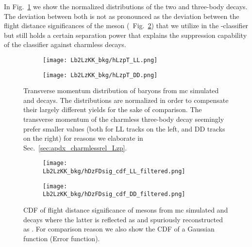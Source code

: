 In Fig.~\ref{fig:apdx_charmlessrel_ptLz} we show the normalized \pt distributions of the two and three-body decays.
The deviation between both is not as pronounced as the deviation between the flight distance significances of the \Dz meson (\cf{}~Fig.~\ref{fig:apdx_charmlessrel_fdDz}) that we utilize in the \Lb-\Dz classifier but still holds a certain separation power that explains the suppression capability of the \Lz classifier against charmless decays.
\begin{figure}[htbp]
    \centering
    \begin{subfigure}{.49\textwidth}
        \centering
        \texttt{[image: Lb2LzKK\_bkg/hLzpT\_LL.png]}
    \end{subfigure}
    \begin{subfigure}{.49\textwidth}
        \centering
        \texttt{[image: Lb2LzKK\_bkg/hLzpT\_DD.png]}
    \end{subfigure}
    \caption{Transverse momentum distribution of \Lz baryons from \gls{mc} simulated \decay{\Lb}{\Dz\Lz} and \decay{\Lb}{\Lz\Km\Kp} decays. The distributions are normalized in order to compensate their largely different yields for the sake of comparison. The transverse momentum of the charmless three-body decay seemingly prefer smaller values (both for \gls{LL} tracks on the left, and \gls{DD} tracks on the right) for reasons we elaborate in Sec.~\ref{sec:apdx_charmlessrel_Lzp}.}
    \label{fig:apdx_charmlessrel_ptLz}
\end{figure}

\begin{figure}[htbp]
    \centering
    \begin{subfigure}{.49\textwidth}
        \centering
        \texttt{[image: Lb2LzKK\_bkg/hDzFDsig\_cdf\_LL\_filtered.png]}
    \end{subfigure}
    \begin{subfigure}{.49\textwidth}
        \centering
        \texttt{[image: Lb2LzKK\_bkg/hDzFDsig\_cdf\_DD\_filtered.png]}
    \end{subfigure}
    \caption{CDF of flight distance significance of \Dz mesons from \gls{mc} simulated \decay{\Lb}{\Dz\Lz} and \decay{\Lb}{\Lz\Km\Kp} decays where the latter is reflected as \decay{\Lb}{\Lz\Km\pip} and spuriously reconstructed as \decay{\Lb}{\Dz\Lz}. For comparison reason we also show the CDF of a Gaussian function (Error function).}
    \label{fig:apdx_charmlessrel_fdDz}
\end{figure}

